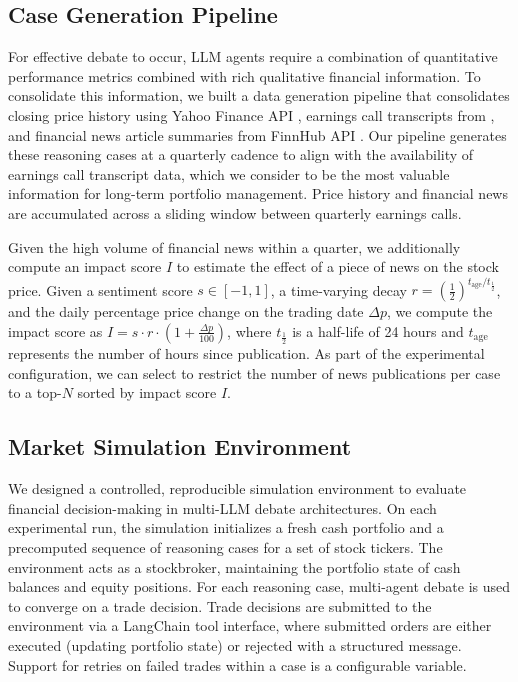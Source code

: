 \documentclass{article}
\begin{document}
\subsection{Case Generation Pipeline}
For effective debate to occur, LLM agents require a combination of quantitative performance metrics combined with rich qualitative financial information. To consolidate this information, we built a data generation pipeline that consolidates closing price history using Yahoo Finance API \citep{yahoofinance}, earnings call transcripts from \citep{earnings-transcripts-dataset}, and financial news article summaries from FinnHub API \citep{finnhub_api}. Our pipeline generates these reasoning cases at a quarterly cadence to align with the availability of earnings call transcript data, which we consider to be the most valuable information for long-term portfolio management. Price history and financial news are accumulated across a sliding window between quarterly earnings calls. 

Given the high volume of financial news within a quarter, we additionally compute an impact score  $I$ to estimate the effect of a piece of news on the stock price. Given a sentiment score $s \in \left[-1,1\right]$, a time-varying decay $r = (\frac{1}{2})^{t_\text{age} / t_{\frac{1}{2}}}$, and the daily percentage price change on the trading date $\Delta p$, we compute the impact score as
$
I = s \cdot r \cdot \left(1 + \frac{\Delta p}{100}\right)
$, where $t_{\frac{1}{2}}$ is a half-life of 24 hours and $t_\text{age}$ represents the number of hours since publication. As part of the experimental configuration, we can select to restrict the number of news publications per case to a top-$N$ sorted by impact score $I$.

\subsection{Market Simulation Environment}
We designed a controlled, reproducible simulation environment to evaluate financial decision-making in multi-LLM debate architectures. On each experimental run, the simulation initializes a fresh cash portfolio and a precomputed sequence of reasoning cases for a set of stock tickers. The environment acts as a stockbroker, maintaining  the portfolio state of cash balances and equity positions. For each reasoning case, multi-agent debate is used to converge on a trade decision. Trade decisions are submitted to the environment via a LangChain tool interface, where submitted orders are either executed (updating portfolio state) or rejected with a structured message. Support for retries on failed trades within a case is a configurable variable.
\end{document}
